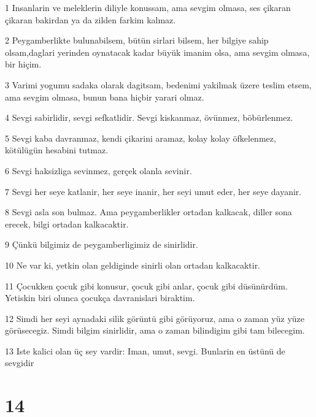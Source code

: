 \par 1 Insanlarin ve meleklerin diliyle konussam, ama sevgim olmasa, ses çikaran çikaran bakirdan ya da zilden farkim kalmaz.
\par 2 Peygamberlikte bulunabilsem, bütün sirlari bilsem, her bilgiye sahip olsam,daglari yerinden oynatacak kadar büyük imanim olsa, ama sevgim olmasa, bir hiçim.
\par 3 Varimi yogumu sadaka olarak dagitsam, bedenimi yakilmak üzere teslim etsem, ama sevgim olmasa, bunun bana hiçbir yarari olmaz.
\par 4 Sevgi sabirlidir, sevgi sefkatlidir. Sevgi kiskanmaz, övünmez, böbürlenmez.
\par 5 Sevgi kaba davranmaz, kendi çikarini aramaz, kolay kolay öfkelenmez, kötülügün hesabini tutmaz.
\par 6 Sevgi haksizliga sevinmez, gerçek olanla sevinir.
\par 7 Sevgi her seye katlanir, her seye inanir, her seyi umut eder, her seye dayanir.
\par 8 Sevgi asla son bulmaz. Ama peygamberlikler ortadan kalkacak, diller sona erecek, bilgi ortadan kalkacaktir.
\par 9 Çünkü bilgimiz de peygamberligimiz de sinirlidir.
\par 10 Ne var ki, yetkin olan geldiginde sinirli olan ortadan kalkacaktir.
\par 11 Çocukken çocuk gibi konusur, çocuk gibi anlar, çocuk gibi düsünürdüm. Yetiskin biri olunca çocukça davranislari biraktim.
\par 12 Simdi her seyi aynadaki silik görüntü gibi görüyoruz, ama o zaman yüz yüze görüsecegiz. Simdi bilgim sinirlidir, ama o zaman bilindigim gibi tam bilecegim.
\par 13 Iste kalici olan üç sey vardir: Iman, umut, sevgi. Bunlarin en üstünü de sevgidir

\chapter{14}

